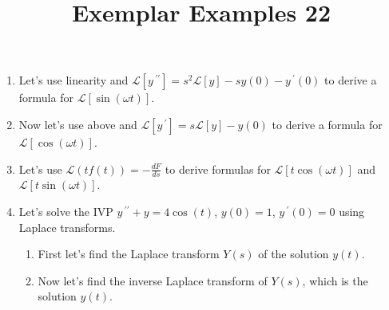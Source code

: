 \documentclass{ximera}
\begin{document}
\begin{abstract}
 \end{abstract}

    \title{Exemplar Examples 22}
    
    \maketitle

\begin{enumerate}

\item Let's use linearity and $\mathcal{L}[y\,^{\prime\prime}]=s^2\mathcal{L}[y]-sy(0)-y\,^{\prime}(0)$ to derive a formula for $\mathcal{L}[\sin{(\omega t)}]$. 


\vfill


 \item Now let's use above and $\mathcal{L}[y\,^{\prime}]=s\mathcal{L}[y]-y(0)$ to derive a formula for $\mathcal{L}[\cos{(\omega t)}]$.


\vfill

\newpage


\item Let's use $\displaystyle \mathcal{L}(tf(t))=-\frac{dF}{ds}$ to derive formulas for $\mathcal{L}[t\cos{(\omega t)}]$ and $\mathcal{L}[t\sin{(\omega t)}]$.



\newpage

\item Let's solve the IVP $y\,^{\prime\prime}+y=4\cos{(t)}$, $y(0)=1$, $y\,^{\prime}(0)=0$ using Laplace transforms.

\begin{enumerate}
\item First let's find the Laplace transform $Y(s)$ of the solution $y(t)$.

\vfill

\item  Now let's  find the inverse Laplace transform of $Y(s)$, which is the solution $y(t)$.


\vfill
\vfill











\end{enumerate}


\end{enumerate}
\end{document}
